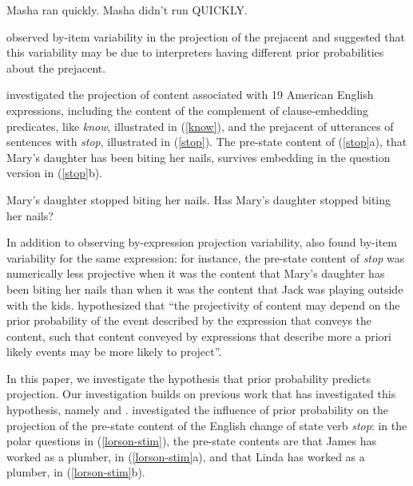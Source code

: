 \documentclass[11pt,fleqn]{article}
\newcommand{\6}{\mbox{$[\hspace*{-.6mm}[$}}
\newcommand{\9}{\mbox{$]\hspace*{-.6mm}]$}}
\begin{document}
\begin{exe}
\ex\label{manner} \citealt[1144]{stevens-etal2017}
\begin{xlist}
\ex Masha ran quickly.
\ex Masha didn't run QUICKLY.
\end{xlist}
\end{exe}
\citealt{stevens-etal2017} observed by-item variability in the projection of the prejacent and suggested that this variability may be due to interpreters having different prior probabilities about the prejacent.

\citealt{tbd-variability} investigated the projection of content associated with 19 American English expressions, including the content of the complement of clause-embedding predicates, like {\em know}, illustrated in (\ref{know}), and the prejacent of utterances of sentences with {\em stop}, illustrated in (\ref{stop}). The pre-state content of (\ref{stop}a), that Mary's daughter has been biting her nails, survives embedding in the question version in (\ref{stop}b).

\begin{exe}
\ex\label{stop}
\begin{xlist}
\ex Mary's daughter stopped biting her nails.
\ex Has Mary's daughter stopped biting her nails?
\end{xlist}
\end{exe}
In addition to observing by-expression projection variability, \citealt{tbd-variability} also found by-item variability for the same expression: for instance, the pre-state content of {\em stop} was numerically less projective when it was the content that Mary's daughter has been biting her nails than when it was the content that Jack was playing outside with the kids. \citealt[500]{tbd-variability} hypothesized that ``the projectivity of content may depend on the prior probability of the event described by the expression that conveys the content, such that content conveyed by expressions that describe more a priori likely events may be more likely to project''.


In this paper, we investigate the hypothesis that prior probability predicts projection. Our investigation builds on previous work that has investigated this hypothesis, namely \citealt{lorson2018} and \citealt{mahler2020}.  \citet{lorson2018} investigated the influence of prior probability on the projection of the pre-state content of the English change of state verb {\em stop}: in the polar questions in (\ref{lorson-stim}), the pre-state contents are that James has worked as a plumber, in (\ref{lorson-stim}a), and that Linda has worked as a plumber, in (\ref{lorson-stim}b).
\end{document}
